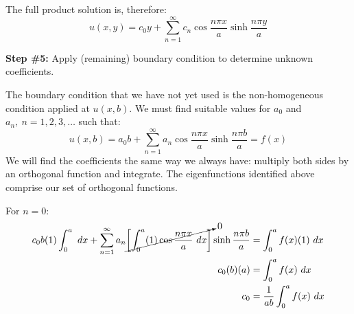 \vspace{0.25cm}

\noindent The full product solution is, therefore:
\begin{equation*}
u(x,y) = c_0y + \sum\limits_{n=1}^{\infty} c_n \cos{\frac{n \pi x}{a}} \sinh{\frac{n \pi y}{a}}
\end{equation*}

\vspace{3.0cm}

\noindent\textbf{Step \#5:} Apply (remaining) boundary condition to determine unknown coefficients.

\vspace{0.25cm}

\noindent The boundary condition that we have not yet used is the non-homogeneous condition applied at $u(x,b)$.  We must find suitable values for $a_0$ and $a_n, \ n=1,2,3,\dots$ such that:
\begin{equation*}
u(x,b) = a_0b + \sum\limits_{n=1}^{\infty}a_n \cos{\frac{n \pi x}{a}}\sinh{\frac{n \pi b}{a}} = f(x)
\end{equation*}
We will find the coefficients the same way we always have: multiply both sides by an orthogonal function and integrate.  The eigenfunctions identified above comprise our set of orthogonal functions.

\vspace{0.25cm}

\noindent For $n=0$:
\begin{align*}
c_0 b (1) \int_{0}^{a} \ dx + \sum\limits_{n=1}^{\infty} a_n \cancelto{0}{\left[\int_0^a (1)\cos{\frac{n \pi x}{a}} \ dx \right]} \sinh{\frac{n \pi b}{a}} &= \int_{0}^a f(x)(1) \ dx \\
c_0 (b) (a) &= \int_0^a f(x) \ dx \\
c_0 &= \frac{1}{ab}\int_0^a f(x) \ dx
\end{align*}

